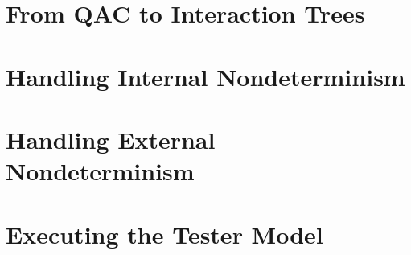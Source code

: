 \section{From QAC to Interaction Trees}
\label{sec:itree}


\section{Handling Internal Nondeterminism}
\label{sec:internal-nondet}


\section{Handling External Nondeterminism}
\label{sec:external-nondet}


\section{Executing the Tester Model}
\label{sec:backtrack}

